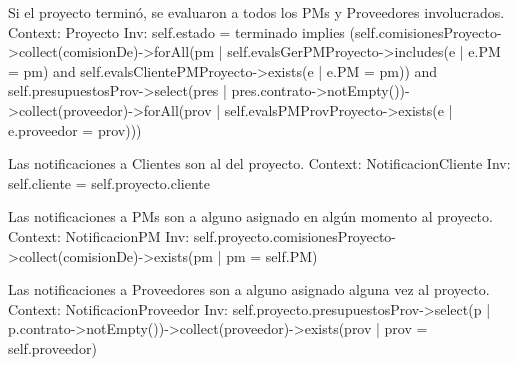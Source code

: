 \begin{listocl}
\begin{itemocl}{Si el proyecto terminó, se evaluaron a todos los PMs y Proveedores involucrados.}
Context: Proyecto
Inv: self.estado = terminado implies (self.comisionesProyecto->collect(comisionDe)->forAll(pm | self.evalsGerPMProyecto->includes(e | e.PM = pm) and self.evalsClientePMProyecto->exists(e | e.PM = pm)) and self.presupuestosProv->select(pres | pres.contrato->notEmpty())->collect(proveedor)->forAll(prov | self.evalsPMProvProyecto->exists(e | e.proveedor = prov)))
\end{itemocl}



\begin{itemocl}{Las notificaciones a Clientes son al del proyecto.}
Context: NotificacionCliente
Inv: self.cliente = self.proyecto.cliente
\end{itemocl}

\begin{itemocl}{Las notificaciones a PMs son a alguno asignado en algún momento al proyecto.}
Context: NotificacionPM
Inv: self.proyecto.comisionesProyecto->collect(comisionDe)->exists(pm | pm = self.PM)
\end{itemocl}

\begin{itemocl}{Las notificaciones a Proveedores son a alguno asignado alguna vez al proyecto.}
Context: NotificacionProveedor
Inv: self.proyecto.presupuestosProv->select(p | p.contrato->notEmpty())->collect(proveedor)->exists(prov | prov = self.proveedor)
\end{itemocl}

\end{listocl}